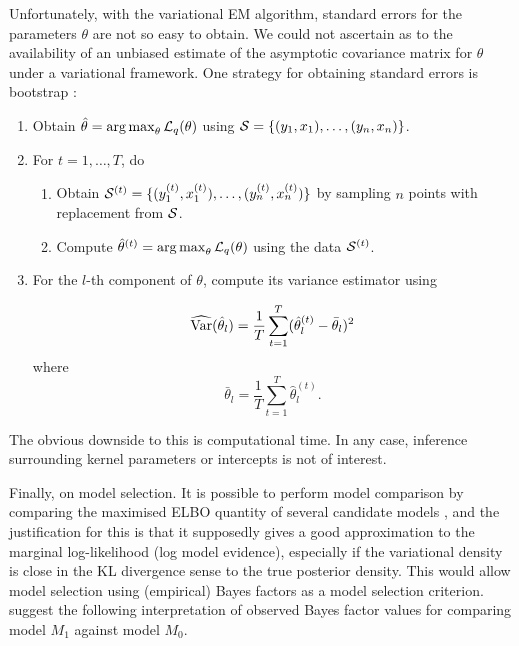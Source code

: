 \begin{remark}
  Unfortunately, with the variational EM algorithm, standard errors for the parameters $\theta$ are not so easy to obtain.  
  We could not ascertain as to the availability of an unbiased estimate of the asymptotic covariance matrix for $\theta$ under a variational framework.
  One strategy for obtaining standard errors is bootstrap \citep{chen2017use}:
  \begin{enumerate}
    \item Obtain $\hat\theta = \operatorname*{arg\,max}_\theta {\mathcal L}_q(\theta)$ using ${\mathcal S} = \{(y_1,x_1),\dots, (y_n,x_n)\}$.
    \item For $t=1,\dots,T$, do
    \begin{enumerate}
      \item Obtain ${\mathcal S}^{(t)} = \{ (y_1^{(t)},x_1^{(t)}),\dots, (y_n^{(t)},x_n^{(t)})\}$ by sampling $n$ points with replacement from ${\mathcal S}$.
      \item Compute $\hat\theta^{(t)} = \operatorname*{arg\,max}_\theta {\mathcal L}_q(\theta)$ using the data ${\mathcal S}^{(t)}$.
    \end{enumerate}
    \item For the $l$-th component of $\theta$, compute its variance estimator using
    
    \[
      \widehat{\operatorname{Var}}(\hat\theta_l) = \frac{1}{T} \sum_{t=1}^T (\hat\theta_l^{(t)} - \bar\theta_l)^2
    \]
    where
    \[
      \bar\theta_l = \frac{1}{T} \sum_{t=1}^T \hat\theta_l^{(t)}.
    \]
  \end{enumerate}
  The obvious downside to this is computational time.
  In any case, inference surrounding kernel parameters or intercepts is not of interest.
\end{remark}

Finally, on model selection.
It is possible to perform model comparison by comparing the maximised ELBO quantity of several candidate models \citep{beal2003}, and the justification for this is that it supposedly gives a good approximation to the marginal log-likelihood (log model evidence), especially if the variational density is close in the KL divergence sense to the true posterior density.
This would allow model selection using (empirical) Bayes factors as a model selection criterion.
\citet{kass1995bayes} suggest the following interpretation of observed Bayes factor values for comparing model $M_1$ against model $M_0$.

